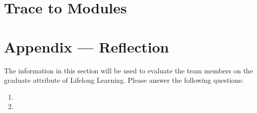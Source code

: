 \documentclass[12pt, titlepage]{article}
\begin{document}
\section{Trace to Modules}		




\newpage{}
\section*{Appendix --- Reflection}

The information in this section will be used to evaluate the team members on the
graduate attribute of Lifelong Learning.  Please answer the following questions:

\begin{enumerate}
  \item 
  \item 
\end{enumerate}
\end{document}
